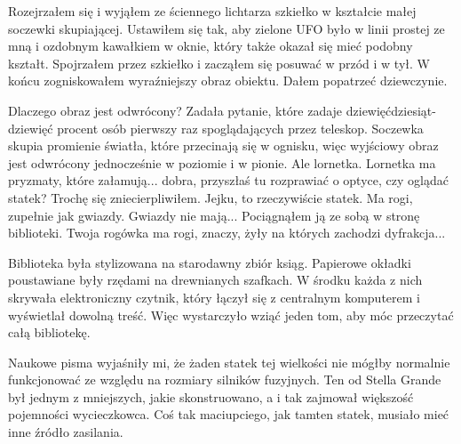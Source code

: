 Rozejrzałem się i wyjąłem ze ściennego lichtarza szkiełko w kształcie małej soczewki skupiającej.
Ustawiłem się tak, aby zielone UFO było w linii prostej ze mną i ozdobnym kawałkiem w oknie, który także okazał się mieć podobny kształt.
Spojrzałem przez szkiełko i zacząłem się posuwać w przód i w tył. W końcu zogniskowałem wyraźniejszy obraz obiektu.
Dałem popatrzeć dziewczynie.

\begin{dialogue}
	\ds{} Dlaczego obraz jest odwrócony? \dm{} Zadała pytanie, które zadaje dziewięćdziesiąt-dziewięć procent osób pierwszy raz spoglądających przez teleskop.
	\ds{} Soczewka skupia promienie światła, które przecinają się w ognisku, więc wyjściowy obraz jest odwrócony jednocześnie w poziomie i w pionie.
	\ds{} Ale lornetka.
	\ds{} Lornetka ma pryzmaty, które załamują... dobra, przyszłaś tu rozprawiać o optyce, czy oglądać statek? \dm{} Trochę się zniecierpliwiłem.
	\ds{} Jejku, to rzeczywiście statek. Ma rogi, zupełnie jak gwiazdy.
	\ds{} Gwiazdy nie mają... \dm{} Pociągnąłem ją ze sobą w stronę biblioteki. \dm{} Twoja rogówka ma rogi, znaczy, żyły na których zachodzi dyfrakcja...
\end{dialogue}

Biblioteka była stylizowana na starodawny zbiór ksiąg.
Papierowe okładki poustawiane były rzędami na drewnianych szafkach.
W środku każda z nich skrywała elektroniczny czytnik, który łączył się z centralnym komputerem i wyświetlał dowolną treść.
Więc wystarczyło wziąć jeden tom, aby móc przeczytać całą bibliotekę.

Naukowe pisma wyjaśniły mi, że żaden statek tej wielkości nie mógłby normalnie funkcjonować ze względu na rozmiary silników fuzyjnych.
Ten od Stella Grande był jednym z mniejszych, jakie skonstruowano, a i tak zajmował większość pojemności wycieczkowca.
Coś tak maciupciego, jak tamten statek, musiało mieć inne źródło zasilania.

